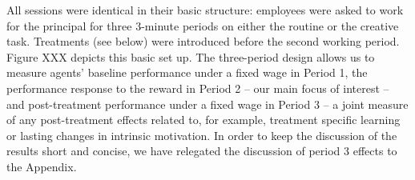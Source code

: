 All sessions were identical in their basic structure: 
employees were asked to work for the principal for three 3-minute periods on either the routine or the creative task. Treatments (see below) were introduced before the second working period. Figure XXX depicts this
basic set up. 
The three-period design allows us to measure agents' baseline performance under a fixed wage in Period 1,
the performance response to the reward in Period 2 -- our main focus of interest -- and post-treatment 
performance under a fixed wage in Period 3 -- a joint measure of any post-treatment effects related to, for example, 
treatment specific learning or lasting changes in intrinsic motivation. In order to keep the discussion of the results 
short and concise, we have relegated the discussion of period 3 effects to the Appendix. 

